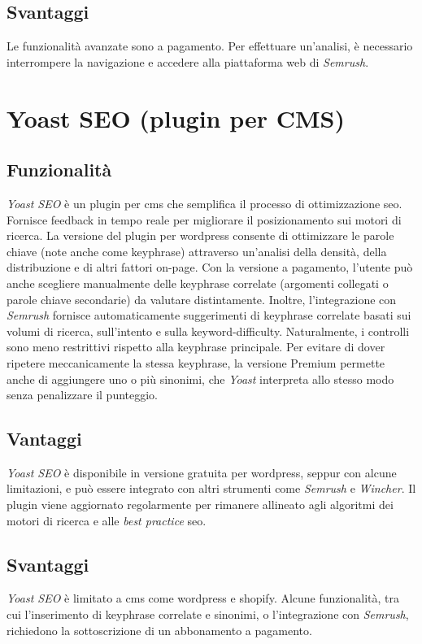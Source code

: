 \subsection{Svantaggi}
Le funzionalità avanzate sono a pagamento. Per effettuare un'analisi, è necessario interrompere la navigazione e accedere alla piattaforma web di \textit{Semrush}.

\section{Yoast SEO (plugin per CMS)}

\subsection{Funzionalità}
\textit{Yoast SEO} è un plugin per \gls{cms} che semplifica il processo di ottimizzazione \gls{seo}. Fornisce feedback in tempo reale per migliorare il posizionamento sui motori di ricerca. La versione del plugin per \gls{wordpress} consente di ottimizzare le parole chiave (note anche come keyphrase) attraverso un'analisi della densità, della distribuzione e di altri fattori \gls{on-page}. Con la versione a pagamento, l'utente può anche scegliere manualmente delle keyphrase correlate (argomenti collegati o parole chiave secondarie) da valutare distintamente. Inoltre, l'integrazione con \textit{Semrush} fornisce automaticamente suggerimenti di keyphrase correlate basati sui volumi di ricerca, sull'intento e sulla \gls{keyword-difficulty}. Naturalmente, i controlli sono meno restrittivi rispetto alla keyphrase principale. Per evitare di dover ripetere meccanicamente la stessa keyphrase, la versione Premium permette anche di aggiungere uno o più sinonimi, che \textit{Yoast} interpreta allo stesso modo senza penalizzare il punteggio.

\subsection{Vantaggi}
\textit{Yoast SEO} è disponibile in versione gratuita per \gls{wordpress}, seppur con alcune limitazioni, e può essere integrato con altri strumenti come \textit{Semrush} e \textit{Wincher}. Il plugin viene aggiornato regolarmente per rimanere allineato agli algoritmi dei motori di ricerca e alle \textit{best practice} \gls{seo}.

\subsection{Svantaggi}
\textit{Yoast SEO} è limitato a \gls{cms} come \gls{wordpress} e \gls{shopify}. Alcune funzionalità, tra cui l'inserimento di keyphrase correlate e sinonimi, o l'integrazione con \textit{Semrush}, richiedono la sottoscrizione di un abbonamento a pagamento.

